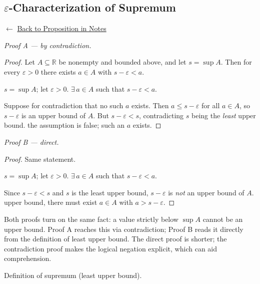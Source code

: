 
\subsection*{$\varepsilon$-Characterization of Supremum}
\label{prf:supremum-approximation}

\begin{remark*}[Return]
$\leftarrow$ \hyperref[prop:eps-char]{Back to Proposition in Notes}
\end{remark*}

\noindent\textit{Proof A — by contradiction.}

\begin{proof}
\Claim Let $A \subseteq \mathbb{R}$ be nonempty and bounded above, and let
$s = \sup A$.
Then for every $\varepsilon > 0$ there exists $a \in A$ with $s - \varepsilon < a$.

\Given $s = \sup A$; let $\varepsilon > 0$.
\Goal $\exists\, a \in A$ such that $s - \varepsilon < a$.

\Strategy Suppose for contradiction that no such $a$ exists.
Then $a \le s - \varepsilon$ for all $a \in A$, so $s - \varepsilon$ is an upper
bound of $A$.
But $s - \varepsilon < s$, contradicting $s$ being the \emph{least} upper bound.
\Therefore the assumption is false; such an $a$ exists. \AsReq
\end{proof}

\medskip
\noindent\textit{Proof B — direct.}

\begin{proof}
\Claim Same statement.

\Given $s = \sup A$; let $\varepsilon > 0$.
\Goal $\exists\, a \in A$ such that $s - \varepsilon < a$.

Since $s - \varepsilon < s$ and $s$ is the least upper bound, $s - \varepsilon$
is \emph{not} an upper bound of $A$.
\ByDef upper bound, there must exist $a \in A$ with $a > s - \varepsilon$. \AsReq
\end{proof}

\begin{remark*}
Both proofs turn on the same fact: a value strictly below $\sup A$ cannot
be an upper bound.
Proof A reaches this via contradiction; Proof B reads it directly from the
definition of least upper bound.
The direct proof is shorter; the contradiction proof makes the logical
negation explicit, which can aid comprehension.
\end{remark*}

\begin{remark*}[Dependencies]
Definition of supremum (least upper bound).
\end{remark*}
